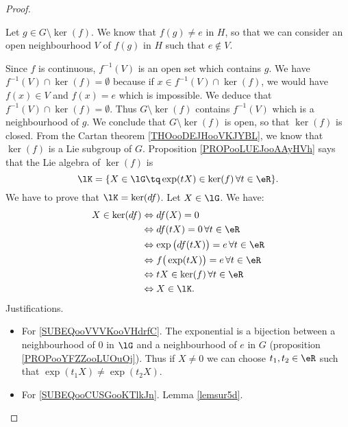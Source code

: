 \begin{theorem}
\begin{proof}
\begin{subproof}
		Let \( g\in G\setminus\ker(f)\). We know that \( f(g)\neq e\) in \( H\), so that we can consider an open neighbourhood \( V\) of \( f(g)\) in \( H\) such that \( e\notin V\).

		Since \( f\) is continuous, \( f^{-1}(V)\) is an open set which contains \( g\). We have \( f^{-1}(V)\cap \ker(f)=\emptyset\) because if \( x\in f^{-1}(V)\cap\ker(f)\), we would have \( f(x)\in V\) and \( f(x)=e\) which is impossible. We deduce that \( f^{-1}(V)\cap\ker(f)=\emptyset\). Thus \( G\setminus\ker(f)\) contains \( f^{-1}(V)\) which is a neighbourhood of \( g\). We conclude that \( G\setminus \ker(f)\) is open, so that \( \ker(f)\) is closed.
		From the Cartan theorem \ref{THOooDEJHooVKJYBL}, we know that \( \ker(f)\) is a Lie subgroup of \( G\).
		Proposition \ref{PROPooLUEJooAAyHVh} says that the Lie algebra of \( \ker(f)\) is
		\begin{equation}
			\lK=\{ X\in \lG\tq \exp(tX)\in \ker(f)\,\forall t\in \eR \}.
		\end{equation}
		We have to prove that \( \lK=\ker(df)\). Let \( X\in \lG\). We have:
		\begin{subequations}
			\begin{align}
				X\in\ker(df) & \Leftrightarrow df(X)=0                                                                      \\
				             & \Leftrightarrow df(tX)=0\,\forall t\in \eR                                                   \\
				             & \Leftrightarrow \exp\big( df(tX) \big)=e\,\forall t\in \eR       \label{SUBEQooVVVKooVHdrfC} \\
				             & \Leftrightarrow f\big( \exp(tX) \big)=e\,\forall t\in \eR  \label{SUBEQooCUSGooKTlkJn}       \\
				             & \Leftrightarrow tX\in\ker(f)\,\forall t\in \eR                                               \\
				             & \Leftrightarrow X\in\lK.
			\end{align}
		\end{subequations}
		Justifications.
		\begin{itemize}
			\item For \eqref{SUBEQooVVVKooVHdrfC}. The exponential is a bijection between a neighbourhood of \( 0\) in \( \lG\) and a neighbourhood of \( e\) in \( G\) (proposition \ref{PROPooYFZZooLUOuOj}). Thus if \( X\neq 0\) we can choose \( t_1,t_2\in \eR\) such that \( \exp(t_1X)\neq \exp(t_2X)\).
			\item For \eqref{SUBEQooCUSGooKTlkJn}. Lemma \ref{lemsur5d}.
		\end{itemize}
	\end{subproof}
\end{proof}


\end{theorem}
